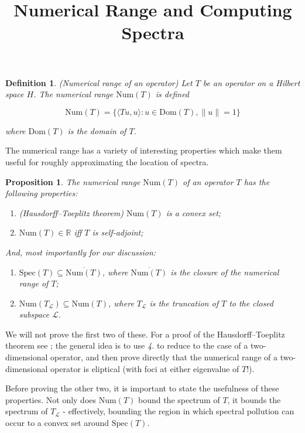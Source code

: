 \documentclass{article}
\title{Numerical Range and Computing Spectra}
\newcommand{\Num}{\text{Num}}
\newcommand{\Spec}{\text{Spec}}
\newtheorem{definition}{Definition}
\newtheorem{proposition}{Proposition}
\begin{document}
\maketitle

\begin{definition}{(Numerical range of an operator)} Let $T$ be an operator on a Hilbert space $H$. The
numerical range $\Num(T)$ is defined

$$\Num(T) = \{\langle Tu, u \rangle : u \in \text{Dom}(T), \|u\|=1\}$$

where $\text{Dom}(T)$ is the domain of $T$.
\end{definition}

The numerical range has a variety of interesting properties which make them useful for roughly approximating
the location of spectra.

\begin{proposition}
The numerical range $\Num(T)$ of an operator $T$ has the following properties:
\begin{enumerate}
\item (Hausdorff–Toeplitz theorem) $\Num(T)$ is a convex set;
\item $\Num(T) \in \mathbb{R}$ iff $T$ is self-adjoint;
\end{enumerate}
And, most importantly for our discussion:
\begin{enumerate}[resume]
\item $\Spec(T) \subseteq \overline{\Num(T)}$, where $\overline{\Num(T)}$ is the closure of the numerical range of $T$;
\item $\Num(T_\mathcal{L}) \subseteq \Num(T)$, where $T_\mathcal{L}$ is the truncation of $T$ to the closed subspace $\mathcal{L}$.
\end{enumerate}
\end{proposition}

We will not prove the first two of these. For a proof of the Hausdorff–Toeplitz theorem see \cite{gustafson1997numerical}; the general idea
is to use \emph{4.} to reduce to the case of a two-dimensional operator, and then prove directly that the numerical range of a two-dimensional
operator is eliptical (with foci at either eigenvalue of $T$!).

Before proving the other two, it is important to state the usefulness of these properties. Not only does $\Num(T)$ bound the spectrum of $T$,
it bounds the spectrum of $T_\mathcal{L}$ - effectively, bounding the region in which spectral pollution can occur to a convex set around $\Spec(T)$.
\end{document}
